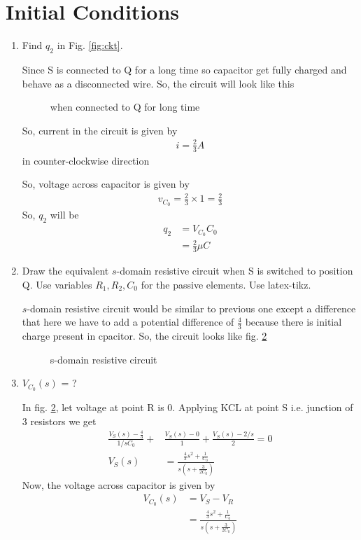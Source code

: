\documentclass[journal,12pt,twocolumn]{IEEEtran}
\renewcommand\thesection{\arabic{section}}
\begin{document}
 \section{Initial Conditions}
\begin{enumerate}[label=\arabic*.,ref=\thesection.\theenumi]

\item Find $q_2$ in Fig. 
			\ref{fig:ckt}.

			\solution
			Since S is connected to Q for a long time so capacitor get fully charged and behave as a disconnected wire. So, the circuit will look like this

			
\begin{figure}[!ht]
	
	\centering
	\caption{when connected to Q for long time}
	\label{crct:3.1}
\end{figure}
		So, current in the circuit is given by
		\begin{align}
			i=\frac{2}{3}A
		\end{align}
		in counter-clockwise direction

		So, voltage across capacitor is given by
		\begin{align}
			v_{C_0}=\frac{2}{3}\times1=\frac{2}{3}
		\end{align}
		So, $q_2$ will be
		\begin{align}
			q_2&=V_{C_0}C_0\\
			&=\frac{2}{3}\mu C
		\end{align}

\item Draw the equivalent $s$-domain resistive circuit when S is switched to position Q.  Use variables $R_1, R_2, C_0$ for the passive elements.
Use latex-tikz.
		\label{prob:init}

		\solution $s$-domain resistive circuit would be similar to previous one except a difference that here we have to add a potential difference of $\frac{4}{3}$ because there is initial charge present in cpacitor.
		So, the circuit looks like fig. \ref{crct:3.2}

\begin{figure}[!ht]
	
	\centering
	\caption{s-domain resistive circuit}
	\label{crct:3.2}
\end{figure}
		\item $V_{C_0}(s)$ = ? 

			\solution In fig. \ref{crct:3.2}, let voltage at point R is 0. Applying KCL at point S i.e. junction of 3 resistors we get
		\begin{align}
			\frac{V_S(s)-\frac{4}{3}}{1/sC_0}+&\frac{V_S(s)-0}{1}+\frac{V_S(s)-2/s}{2}=0\\
			V_S(s)&=\frac{\frac{4}{3}s^2+\frac{1}{C_0}}{s(s+\frac{3}{2C_0})}
		\end{align}
		Now, the voltage across capacitor is given by
		\begin{align}
			V_{C_0}(s)&=V_S-V_R\\
			&=\frac{\frac{4}{3}s^2+\frac{1}{C_0}}{s(s+\frac{3}{2C_0})}
		\end{align}


\end{enumerate}
\end{document}

